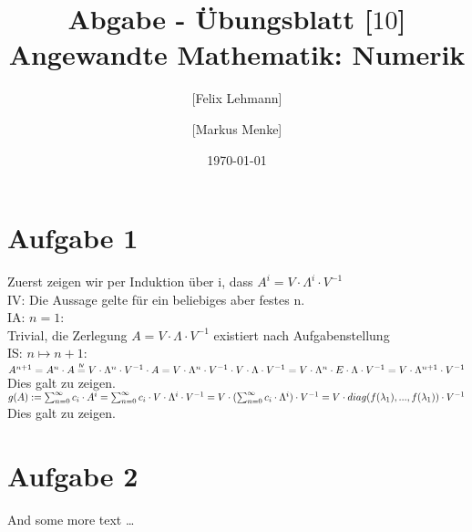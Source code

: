\documentclass[10pt,a4paper]{article}
\newcommand\iv{\mathrel{\overset{\makebox[0pt]{\mbox{\normalfont\tiny\sffamily IV}}}{=}}}
\begin{document}
\title{Abgabe - Übungsblatt [$10$]\\
\small{Angewandte Mathematik: Numerik}}
\author{ [Felix Lehmann] \and [Markus Menke]}
\date{\today}
\maketitle

\section*{Aufgabe 1}
Zuerst zeigen wir per Induktion über i, dass $A^{i} = V \cdot \Lambda^{i} \cdot V^{-1}$\\
IV: Die Aussage gelte für ein beliebiges aber festes n.\\
IA: $n = 1$:\\
Trivial, die Zerlegung $A = V \cdot \Lambda \cdot V^{-1}$ existiert nach Aufgabenstellung\\
IS: $n \mapsto n+1$:\\
$A^{n+1} = A^{n} \cdot A \iv V \cdot \Lambda^{n} \cdot V^{-1} \cdot A = V \cdot \Lambda^{n} \cdot V^{-1} \cdot V \cdot \Lambda \cdot V^{-1}\\
= V \cdot \Lambda^{n} \cdot E \cdot \Lambda \cdot V^{-1} = V \cdot \Lambda^{n+1} \cdot V^{-1}$\\
Dies galt zu zeigen.\\

$g(A):=  \sum_{n=0}^{\infty} c_{i} \cdot A^{i} = \sum_{n=0}^{\infty} c_{i} \cdot V \cdot \Lambda^{i} \cdot V^{-1}\\
= V \cdot (\sum_{n=0}^{\infty} c_{i}\cdot\Lambda^{i}) \cdot V^{-1} = V \cdot diag(f(\lambda_{1}),...,f(\lambda_{1})) \cdot V^{-1} $\\
Dies galt zu zeigen.\\
 
\section*{Aufgabe 2}
And some more text \ldots
\end{document}
